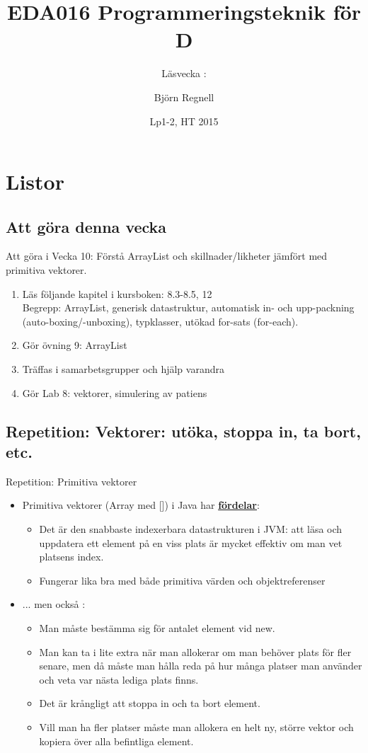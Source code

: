 \documentclass{lecturenotes}
\title[Föreläsningsanteckningar EDA016, 2015]{EDA016 Programmeringsteknik för D}
\subtitle{Läsvecka \vecka: \tema}
\author{Björn Regnell}
\institute{Datavetenskap, LTH}
\date{Lp1-2, HT 2015}
\renewcommand{\vecka}{10}
\newcommand{\tema}{Listor}
\begin{document}
\frame{\titlepage}
\setnextsection{\vecka}
\section[Vecka \vecka: \tema]{\tema}
\frame{\tableofcontents}

\subsection{Att göra denna vecka}
\begin{Slide}{Att göra i Vecka \vecka: Förstå ArrayList och skillnader/likheter jämfört med primitiva vektorer.}
\begin{enumerate}
\item Läs följande kapitel i kursboken:  8.3-8.5, 12 \\  
Begrepp: ArrayList, generisk datastruktur, automatisk in- och upp-packning (auto-boxing/-unboxing), typklasser, utökad for-sats (for-each).
\item Gör övning 9: ArrayList
\item Träffas i samarbetsgrupper och hjälp varandra 
\item Gör Lab 8: vektorer, simulering av patiens
\end{enumerate}
\end{Slide}

\subsection{Repetition: Vektorer: utöka, stoppa in, ta bort, etc.}
\begin{Slide}{Repetition: Primitiva vektorer}
\begin{itemize}
\item Primitiva vektorer (Array med []) i Java har \textbf{\href{http://stackoverflow.com/questions/2843928/benefits-of-arrays}{fördelar}}: 
\begin{itemize}\footnotesize
\item Det är den snabbaste indexerbara datastrukturen i JVM: att läsa och uppdatera ett element på en viss plats är mycket effektiv om man vet platsens index. 
\item Fungerar lika bra med både primitiva värden och objektreferenser
\end{itemize}
\item ... men också :
\begin{itemize}\footnotesize
\item Man måste bestämma sig för antalet element vid new. 
\item Man kan ta i lite extra när man allokerar om man behöver plats för fler senare, men då måste man hålla reda på hur många platser man använder och veta var nästa lediga plats finns.
\item Det är krångligt att stoppa in  och ta bort  element.
\item Vill man ha fler platser måste man allokera en helt ny, större vektor och kopiera över alla befintliga element.
\end{itemize}

\end{itemize}
\end{Slide}
\end{document}
